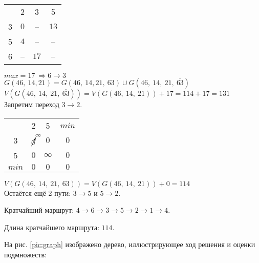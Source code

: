 \begin{table}[H]
\begin{center}
	\def\tabcolsep{18pt}
	\def\arraystretch{1.5}
	\fontsize{13}{14}\selectfont
	\begin{tabular}{|c||c|c|c|}
		\hline 
	  	& 2 & 3 & 5 \\ 
		\hhline{|=#=|=|=|} 
		3 & $0$ & -- & $13$ \\ 
		\hline 
		5 & $4$ & -- & -- \\ 
		\hline 
		6 & -- & \cellcolor{pink} $17$ & -- \\
		\hline
	\end{tabular}  
\end{center}
\end{table}

$max = 17\ \Rightarrow 6 \rightarrow 3$\\
	
$G(46,\ 14, 21) = G(46,\ 14, 21,\ 63) \cup G(46,\ 14,\ 21,\ \overline{63})$\\
$V(G(46,\ 14,\ 21,\ \overline{63})) = V(G(46,\ 14,\ 21)) + 17 = 114 + 17 = 131$\\
Запретим переход $3 \rightarrow 2$.

\begin{table}[H]
\begin{center}
	\def\tabcolsep{18pt}
	\def\arraystretch{1.5}
	\fontsize{13}{14}\selectfont
	\begin{tabular}{|c||c|c||c|}
		\hline 
	  	& 2 & 5 & $min$ \\ 
		\hhline{|=#=|=#=|} 
		3 & $\cancelto{\infty}{0}$ & $0$ & $0$\\ 
		\hline 
		5 & $0$ & $\infty$ & $0$ \\ 		
		\hhline{|=#=|=#=|}
		$min$ & $0$ & $0$ & $0$ \\
		\hline		
	\end{tabular}  
\end{center}
\end{table}

$V(G(46,\ 14,\ 21,\ 63)) = V(G(46,\ 14,\ 21)) + 0 = 114$\\

Остаётся ещё 2 пути: $3 \rightarrow 5$ и $5 \rightarrow 2$.

Кратчайший маршрут: $4 \rightarrow 6 \rightarrow 3 \rightarrow 5 \rightarrow 2 \rightarrow 1 \rightarrow 4$.

Длина кратчайшего маршрута: $114$.

На рис. \ref{pic:graph} изображено дерево, иллюстрирующее ход решения и оценки подмножеств:

